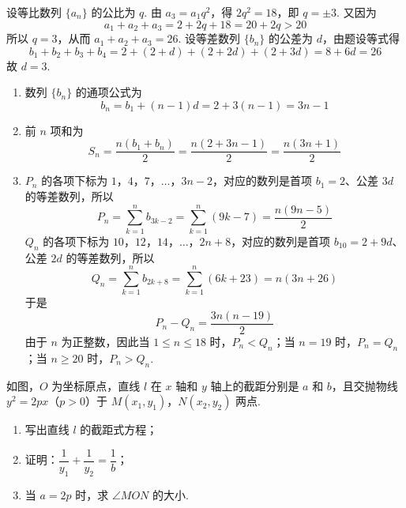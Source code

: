 \begin{solution}
设等比数列 \(\{a_n\}\) 的公比为 \(q\). 由 \(a_3=a_1q^2\)，得 \(2q^2=18\)，即 \(q=\pm3\). 又因为
\[
a_1+a_2+a_3=2+2q+18=20+2q>20
\]
所以 \(q=3\)，从而 \(a_1+a_2+a_3=26\). 设等差数列 \(\{b_n\}\) 的公差为 \(d\)，由题设等式得
\[
b_1+b_2+b_3+b_4=2+(2+d)+(2+2d)+(2+3d)=8+6d=26
\]
故 \(d=3\).

\begin{enumerate}
\item 数列 \(\{b_n\}\) 的通项公式为
\[
b_n=b_1+(n-1)d=2+3(n-1)=3n-1
\]

\item 前 \(n\) 项和为
\[
S_n=\dfrac{n(b_1+b_n)}{2}=\dfrac{n(2+3n-1)}{2}=\dfrac{n(3n+1)}{2}
\]

\item \(P_n\) 的各项下标为 \(1\)，\(4\)，\(7\)，\(\ldots\)，\(3n-2\)，对应的数列是首项 \(b_1=2\)、公差 \(3d\) 的等差数列，所以
\[
P_n=\sum_{k=1}^n b_{3k-2}=\sum_{k=1}^n(9k-7)=\dfrac{n(9n-5)}{2}
\]
\(Q_n\) 的各项下标为 \(10\)，\(12\)，\(14\)，\(\ldots\)，\(2n+8\)，对应的数列是首项 \(b_{10}=2+9d\)、公差 \(2d\) 的等差数列，所以
\[
Q_n=\sum_{k=1}^n b_{2k+8}=\sum_{k=1}^n(6k+23)=n(3n+26)
\]
于是
\[
P_n-Q_n=\dfrac{3n(n-19)}{2}
\]
由于 \(n\) 为正整数，因此当 \(1\leqslant n\leqslant18\) 时，\(P_n<Q_n\)；当 \(n=19\) 时，\(P_n=Q_n\)；当 \(n\geqslant20\) 时，\(P_n>Q_n\).
\end{enumerate}
\end{solution}

\begin{problem}
如图，\(O\) 为坐标原点，直线 \(l\) 在 \(x\) 轴和 \(y\) 轴上的截距分别是 \(a\) 和 \(b\)，且交抛物线 \(y^2=2px\)（\(p>0\)）于 \(M\left(x_1,y_1\right)\)，\(N\left(x_2,y_2\right)\) 两点.

\begin{enumerate}
\item 写出直线 \(l\) 的截距式方程；
\item 证明：\(\dfrac{1}{y_1}+\dfrac{1}{y_2}=\dfrac{1}{b}\)；
\item 当 \(a=2p\) 时，求 \(\angle MON\) 的大小.
\end{enumerate}

\end{problem}

